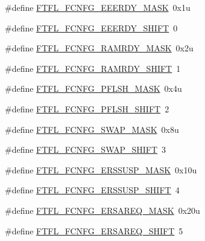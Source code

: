 \begin{DoxyCompactItemize}
\item 
\#define \hyperlink{group___f_t_f_l___register___masks_ga223da0ec4b235360803f3c99975720fb}{F\+T\+F\+L\+\_\+\+F\+C\+N\+F\+G\+\_\+\+E\+E\+E\+R\+D\+Y\+\_\+\+M\+A\+SK}~0x1u
\item 
\#define \hyperlink{group___f_t_f_l___register___masks_ga1a9c07d1eafc3125cb3f2bded6515ed2}{F\+T\+F\+L\+\_\+\+F\+C\+N\+F\+G\+\_\+\+E\+E\+E\+R\+D\+Y\+\_\+\+S\+H\+I\+FT}~0
\item 
\#define \hyperlink{group___f_t_f_l___register___masks_gaa079c0487aa35c8a06dbebddc2c960ef}{F\+T\+F\+L\+\_\+\+F\+C\+N\+F\+G\+\_\+\+R\+A\+M\+R\+D\+Y\+\_\+\+M\+A\+SK}~0x2u
\item 
\#define \hyperlink{group___f_t_f_l___register___masks_ga4e6f3844069dcbb1a0a572a5e2e8572f}{F\+T\+F\+L\+\_\+\+F\+C\+N\+F\+G\+\_\+\+R\+A\+M\+R\+D\+Y\+\_\+\+S\+H\+I\+FT}~1
\item 
\#define \hyperlink{group___f_t_f_l___register___masks_gab69a16e2bdad743bcb6ef431e8280d71}{F\+T\+F\+L\+\_\+\+F\+C\+N\+F\+G\+\_\+\+P\+F\+L\+S\+H\+\_\+\+M\+A\+SK}~0x4u
\item 
\#define \hyperlink{group___f_t_f_l___register___masks_gafe9d7f1b93cfee80364f32ef3bb71847}{F\+T\+F\+L\+\_\+\+F\+C\+N\+F\+G\+\_\+\+P\+F\+L\+S\+H\+\_\+\+S\+H\+I\+FT}~2
\item 
\#define \hyperlink{group___f_t_f_l___register___masks_gad0e9c77377c1ce86034ae64293617b62}{F\+T\+F\+L\+\_\+\+F\+C\+N\+F\+G\+\_\+\+S\+W\+A\+P\+\_\+\+M\+A\+SK}~0x8u
\item 
\#define \hyperlink{group___f_t_f_l___register___masks_gac9073c0a54af442456b0e5f72f1049ed}{F\+T\+F\+L\+\_\+\+F\+C\+N\+F\+G\+\_\+\+S\+W\+A\+P\+\_\+\+S\+H\+I\+FT}~3
\item 
\#define \hyperlink{group___f_t_f_l___register___masks_gae512d6243ccce7b518cadd264079490b}{F\+T\+F\+L\+\_\+\+F\+C\+N\+F\+G\+\_\+\+E\+R\+S\+S\+U\+S\+P\+\_\+\+M\+A\+SK}~0x10u
\item 
\#define \hyperlink{group___f_t_f_l___register___masks_ga2968029948ad75424c9840d912fe0a2f}{F\+T\+F\+L\+\_\+\+F\+C\+N\+F\+G\+\_\+\+E\+R\+S\+S\+U\+S\+P\+\_\+\+S\+H\+I\+FT}~4
\item 
\#define \hyperlink{group___f_t_f_l___register___masks_ga1232c8e74318df0071238dbaca28f52f}{F\+T\+F\+L\+\_\+\+F\+C\+N\+F\+G\+\_\+\+E\+R\+S\+A\+R\+E\+Q\+\_\+\+M\+A\+SK}~0x20u
\item 
\#define \hyperlink{group___f_t_f_l___register___masks_gae253a51bdaf93fffd9d63bf230bd1aa7}{F\+T\+F\+L\+\_\+\+F\+C\+N\+F\+G\+\_\+\+E\+R\+S\+A\+R\+E\+Q\+\_\+\+S\+H\+I\+FT}~5
\item 

\end{DoxyCompactItemize}

